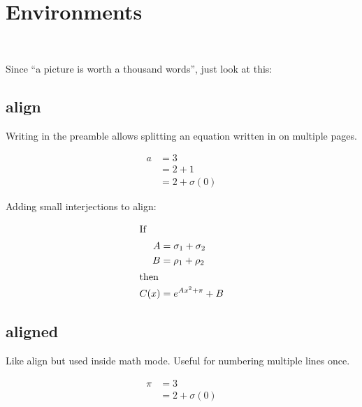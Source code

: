 \section{Environments}
\\

Since ``a picture is worth a thousand words'', just look at this:

\subsection{align}
Writing \code{\allowdisplaybreaks} in the preamble allows splitting an equation written in  on multiple pages.

\begin{example}
\begin{align}
  a & = 3\\
    & = 2 + 1 \nonumber \\
    & = 2 + \sigma(0)
\end{align}
\end{example}

Adding small interjections to align:\\
\begin{example}
\begin{minipage}{3in}
\begin{align*}
\intertext{If}
   A &= \sigma_1+\sigma_2\\
   B &= \rho_1+\rho_2\\
\intertext{then}
C(x) &= e^{Ax^2+\pi}+B
\end{align*} 
\end{minipage}
\end{example}

\subsection{aligned}
Like align but used inside math mode. Useful for numbering multiple lines once.

\begin{example}
\begin{equation}
\begin{aligned}
  \pi & = 3\\
    & = 2 + \sigma(0)
\end{aligned}
\end{equation}
\end{example}

